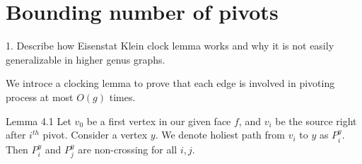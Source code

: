 \documentclass{article}
\begin{document}
\begin{figure}
\begin{subfigure}{.5\textwidth}
\end{subfigure}
\end{figure}

\newpage
\section{Bounding number of pivots}

\begin{center}
{\color{red}
1. Describe how Eisenstat Klein clock lemma works and why it is not easily
generalizable in higher genus graphs.}
\end{center}

We introce a clocking lemma to prove that each edge is involved in pivoting 
process at most $O(g)$ times.

\begin{oneshot}{Lemma 4.1}
Let $v_0$ be a first vertex in our given face $f$, and $v_i$ be the source right
after $i^{th}$ pivot. Consider a vertex $y$. We denote holiest path from 
$v_i$ to $y$ as $P_i^{y}$. Then $P_i^{y}$ and $P_j^{y}$ are non-crossing for 
all $i, j$.
\end{oneshot}
\end{document}
